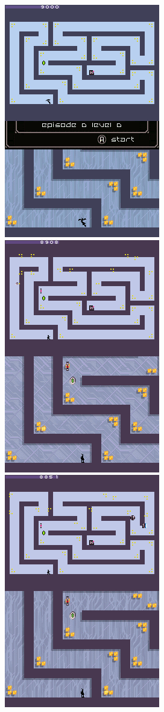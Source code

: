 \documentclass[
]{book}
\begin{document}
\includegraphics{images/168_home_fast6191_romhackingguide_unrenamed_fil___ers_romhackingguideleveleditingworkedNplus1.png}\includegraphics{images/177_home_fast6191_romhackingguide_unrenamed_fil___rs_romhackingguideleveleditingworkedNplus10.png}\includegraphics{images/178_home_fast6191_romhackingguide_unrenamed_fil___rs_romhackingguideleveleditingworkedNplus11.png}
\end{document}
